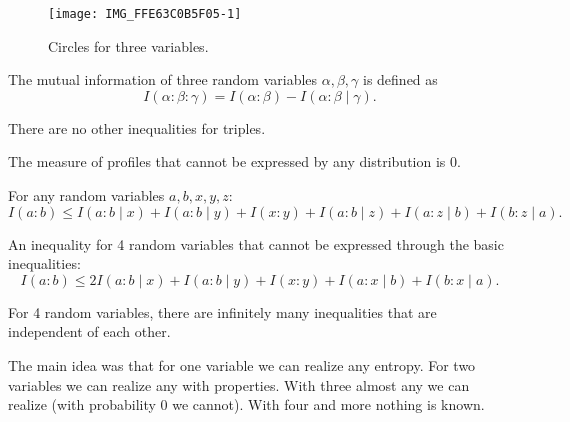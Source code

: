 \begin{figure}[htpb]
	\centering
	\texttt{[image: IMG\_FFE63C0B5F05-1]}
	\caption{Circles for three variables.}
	\label{fig:IMG_FFE63C0B5F05-1}
\end{figure}

\begin{definition}
	The mutual information of three random variables $\alpha, \beta, \gamma$ is defined as
	\[
	I(\alpha : \beta : \gamma) = I(\alpha : \beta) - I(\alpha : \beta  \mid \gamma)
	.\] 
\end{definition}
\begin{statement}
	There are no other inequalities for triples.
\end{statement}
\begin{statement}
	The measure of profiles that cannot be expressed by any distribution is 0.
\end{statement}

\begin{statement}
	For any random variables $a, b, x, y, z$:
	 \[
	I(a : b) \le  I(a : b  \mid x) + I(a : b  \mid  y) + I(x : y) + I(a : b  \mid z) + I(a : z  \mid b) + I(b : z  \mid  a)
	.\] 
\end{statement}

\begin{corollary}
	An inequality for 4 random variables that cannot be expressed through the basic inequalities:
	\[
	I(a : b) \le  2 I(a : b  \mid x) + I(a : b  \mid  y) + I(x : y) + I(a : x  \mid b) + I(b : x  \mid  a)
	.\] 
\end{corollary}

\begin{statement}
	For 4 random variables, there are infinitely many inequalities that are independent of each other.
\end{statement}

The main idea was that for one variable we can realize any entropy.
For two variables we can realize any with properties.
With three almost any we can realize (with probability 0 we cannot).
With four and more nothing is known.


